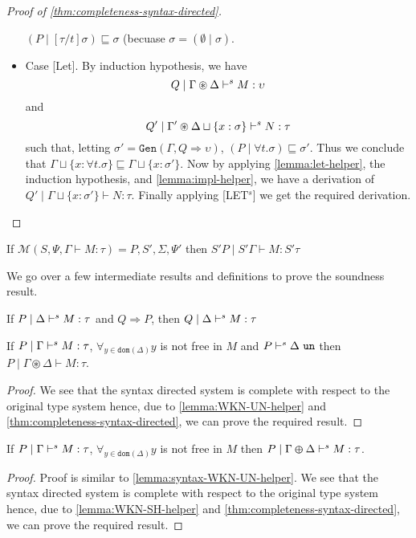 \begin{proof}[Proof of \cref{thm:completeness-syntax-directed}]
\begin{itemize}
    $(P \mid [\tau / t]\sigma) \sqsubseteq \sigma$ (becuase $\sigma = (\emptyset \mid \sigma)$.
  \item{Case [Let].}
    By induction hypothesis, we have $$Q \mid \Gamma \circledast \Delta \vdash^s M: \upsilon$$ and
    $$Q' \mid \Gamma' \circledast \Delta \sqcup \{x:\sigma\} \vdash^s N:\tau$$
    such that, letting $\sigma' = \texttt{Gen}(\Gamma, Q \Rightarrow \upsilon)$, $(P \mid \forall t. \sigma) \sqsubseteq \sigma'$. Thus we conclude that
    $\Gamma \sqcup \{ x:\forall t. \sigma \} \sqsubseteq   \Gamma \sqcup \{ x:\sigma'\}$. Now by applying \cref{lemma:let-helper}, the induction hypothesis, and \cref{lemma:impl-helper},
    we have a derivation of $Q' \mid \Gamma \sqcup \{ x:\sigma'\} \vdash N:\tau$. Finally applying [LET$^s$] we get the required derivation.
      \qedhere
  \end{itemize}
\end{proof}


\begin{theorem}\label{thm:soundness-m}
   If $\mathcal{M}(S, \Psi, \Gamma \vdash M : \tau) = P, S', \Sigma, \Psi'$ then $S' P \mid S' \Gamma \vdash M : S' \tau$
 \end{theorem}

We go over a few intermediate results and definitions to prove the soundness result.

\begin{lemma}\label{lemma:strengthen}
  If $P \mid \Delta \vdash^s M:\tau$ and $Q \Rightarrow P$, then $Q \mid \Delta \vdash^s M: \tau$
\end{lemma}

\begin{lemma}\label{lemma:syntax-WKN-UN-helper}
  If $P \mid \Gamma \vdash^s M:\tau$, $\forall_{y \in \texttt{dom}(\Delta)} y$ is not free in $M$ and $P \vdash^s \Delta\ \texttt{un}$
  then $P \mid \Gamma \circledast \Delta \vdash M:\tau$.
\end{lemma}
\begin{proof}
  We see that the syntax directed system is complete with respect to the original type system hence, due to \cref{lemma:WKN-UN-helper} and \cref{thm:completeness-syntax-directed}, we can prove the required result.
\end{proof}

\begin{lemma}\label{lemma:syntax-WKN-SH-helper}
  If $P \mid \Gamma \vdash^s M:\tau$, $\forall_{y \in \texttt{dom}(\Delta)} y$ is not free in $M$ then $P \mid \Gamma \varoplus \Delta \vdash^s M:\tau$.
\end{lemma}
\begin{proof}
  Proof is similar to \cref{lemma:syntax-WKN-UN-helper}. We see that the syntax directed system is complete with respect to the original type system hence,
  due to \cref{lemma:WKN-SH-helper} and \cref{thm:completeness-syntax-directed}, we can prove the required result.
\end{proof}

